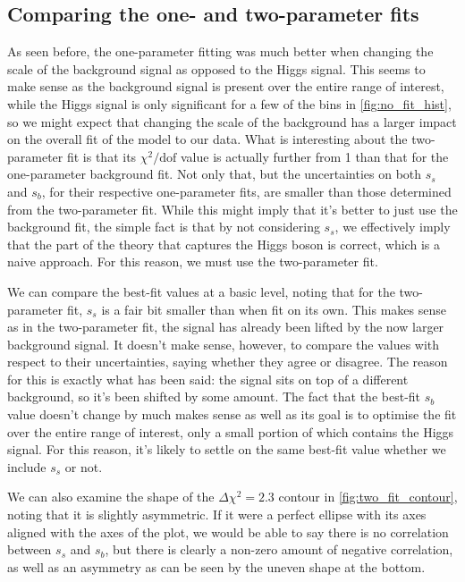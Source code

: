 \documentclass[11pt]{article}
\newcommand{\chisq}{\chi^2}
\newcommand{\chisqdof}{\chi^2/\mathrm{dof}}
\numberwithin{equation}{section}
\numberwithin{figure}{section}
\numberwithin{table}{section}
\begin{document}
\subsection{Comparing the one- and two-parameter fits}
As seen before, the one-parameter fitting was much better when changing the scale of the background signal as opposed to the Higgs signal. This seems to make sense as the background signal is present over the entire range of interest, while the Higgs signal is only significant for a few of the bins in \cref{fig:no_fit_hist}, so we might expect that changing the scale of the background has a larger impact on the overall fit of the model to our data. What is interesting about the two-parameter fit is that its $\chisqdof$ value is actually further from 1 than that for the one-parameter background fit. Not only that, but the uncertainties on both $s_s$ and $s_b$, for their respective one-parameter fits, are smaller than those determined from the two-parameter fit. While this might imply that it's better to just use the background fit, the simple fact is that by not considering $s_s$, we effectively imply that the part of the theory that captures the Higgs boson is correct, which is a naive approach. For this reason, we must use the two-parameter fit. 

We can compare the best-fit values at a basic level, noting that for the two-parameter fit, $s_s$ is a fair bit smaller than when fit on its own. This makes sense as in the two-parameter fit, the signal has already been lifted by the now larger background signal. It doesn't make sense, however, to compare the values with respect to their uncertainties, saying whether they agree or disagree. The reason for this is exactly what has been said: the signal sits on top of a different background, so it's been shifted by some amount. The fact that the best-fit $s_b$ value doesn't change by much makes sense as well as its goal is to optimise the fit over the entire range of interest, only a small portion of which contains the Higgs signal. For this reason, it's likely to settle on the same best-fit value whether we include $s_s$ or not.

We can also examine the shape of the $\Delta\chisq=2.3$ contour in \cref{fig:two_fit_contour}, noting that it is slightly asymmetric. If it were a perfect ellipse with its axes aligned with the axes of the plot, we would be able to say there is no correlation between $s_s$ and $s_b$, but there is clearly a non-zero amount of negative correlation, as well as an asymmetry as can be seen by the uneven shape at the bottom.
\end{document}

